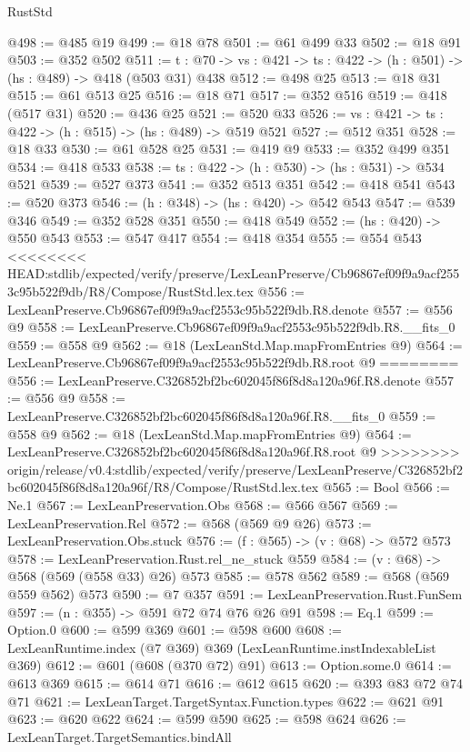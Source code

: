 \begin{lexlean}{RustStd}
\begin{coremodule}
{\begin{coremodule}
@498 := @485 @19
@499 := @18 @78
@501 := @61 @499 @33
@502 := @18 @91
@503 := @352 @502
@511 := {t : @70} -> {vs : @421} -> {ts : @422} -> (h : @501) -> (hs : @489) -> @418 (@503 @31) @438
@512 := @498 @25
@513 := @18 @31
@515 := @61 @513 @25
@516 := @18 @71
@517 := @352 @516
@519 := @418 (@517 @31)
@520 := @436 @25
@521 := @520 @33
@526 := {vs : @421} -> {ts : @422} -> (h : @515) -> (hs : @489) -> @519 @521
@527 := @512 @351
@528 := @18 @33
@530 := @61 @528 @25
@531 := @419 @9
@533 := @352 @499 @351
@534 := @418 @533
@538 := {ts : @422} -> (h : @530) -> (hs : @531) -> @534 @521
@539 := @527 @373
@541 := @352 @513 @351
@542 := @418 @541
@543 := @520 @373
@546 := (h : @348) -> (hs : @420) -> @542 @543
@547 := @539 @346
@549 := @352 @528 @351
@550 := @418 @549
@552 := (hs : @420) -> @550 @543
@553 := @547 @417
@554 := @418 @354
@555 := @554 @543
<<<<<<<< HEAD:stdlib/expected/verify/preserve/LexLeanPreserve/Cb96867ef09f9a9acf2553c95b522f9db/R8/Compose/RustStd.lex.tex
@556 := LexLeanPreserve.Cb96867ef09f9a9acf2553c95b522f9db.R8.denote
@557 := @556 @9
@558 := LexLeanPreserve.Cb96867ef09f9a9acf2553c95b522f9db.R8.__fits_0
@559 := @558 @9
@562 := @18 (LexLeanStd.Map.mapFromEntries @9)
@564 := LexLeanPreserve.Cb96867ef09f9a9acf2553c95b522f9db.R8.root @9
========
@556 := LexLeanPreserve.C326852bf2bc602045f86f8d8a120a96f.R8.denote
@557 := @556 @9
@558 := LexLeanPreserve.C326852bf2bc602045f86f8d8a120a96f.R8.__fits_0
@559 := @558 @9
@562 := @18 (LexLeanStd.Map.mapFromEntries @9)
@564 := LexLeanPreserve.C326852bf2bc602045f86f8d8a120a96f.R8.root @9
>>>>>>>> origin/release/v0.4:stdlib/expected/verify/preserve/LexLeanPreserve/C326852bf2bc602045f86f8d8a120a96f/R8/Compose/RustStd.lex.tex
@565 := Bool
@566 := Ne.{1}
@567 := LexLeanPreservation.Obs
@568 := @566 @567
@569 := LexLeanPreservation.Rel
@572 := @568 (@569 @9 @26)
@573 := LexLeanPreservation.Obs.stuck
@576 := (f : @565) -> (v : @68) -> @572 @573
@578 := LexLeanPreservation.Rust.rel_ne_stuck @559
@584 := (v : @68) -> @568 (@569 (@558 @33) @26) @573
@585 := @578 @562
@589 := @568 (@569 @559 @562) @573
@590 := @7 @357
@591 := LexLeanPreservation.Rust.FunSem
@597 := (n : @355) -> @591 @72 @74 @76 @26 @91
@598 := Eq.{1}
@599 := Option.{0}
@600 := @599 @369
@601 := @598 @600
@608 := LexLeanRuntime.index (@7 @369) @369 (LexLeanRuntime.instIndexableList @369)
@612 := @601 (@608 (@370 @72) @91)
@613 := Option.some.{0}
@614 := @613 @369
@615 := @614 @71
@616 := @612 @615
@620 := @393 @83 @72 @74 @71
@621 := LexLeanTarget.TargetSyntax.Function.types
@622 := @621 @91
@623 := @620 @622
@624 := @599 @590
@625 := @598 @624
@626 := LexLeanTarget.TargetSemantics.bindAll

\end{coremodule}}
\end{coremodule}
\end{lexlean}
